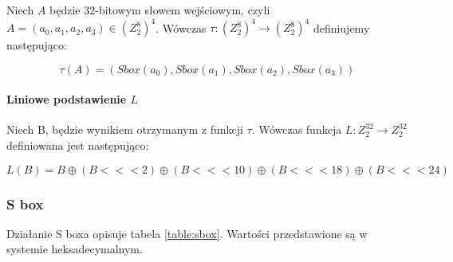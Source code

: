 Niech $A$ będzie 32-bitowym słowem wejściowym, czyli $A = (a_0, a_1, a_2, a_3) \in (Z^8_2)^4$. Wówczas $\tau: (Z^8_2)^4 \rightarrow (Z^8_2)^4$ definiujemy następująco:

\begin{equation*}
    \tau(A) = (Sbox(a_0), Sbox(a_1), Sbox(a_2), Sbox(a_3))
\end{equation*}

\paragraph{Liniowe podstawienie $L$}\mbox{}

Niech B, będzie wynikiem otrzymanym z funkcji $\tau$. Wówczas funkcja $L: Z^{32}_2 \rightarrow Z^{32}_2$ definiowana jest następująco:

\begin{equation*}
    L(B) = B \oplus (B <<< 2)  \oplus (B <<< 10)  \oplus (B <<< 18)  \oplus (B <<< 24) 
\end{equation*}

\subsubsection{S box}

Działanie S boxa opisuje tabela \ref{table:sbox}. Wartości przedstawione są w systemie heksadecymalnym.


